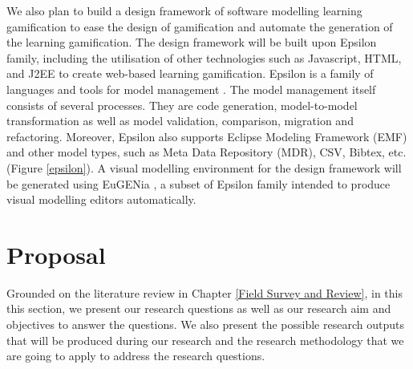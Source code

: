 \documentclass[12pt, a4paper]{report}
\begin{document}
{We also plan to build a design framework of software modelling learning gamification to ease the design of gamiﬁcation and automate the generation of the learning gamification. The design framework will be built upon Epsilon family, including the utilisation of other technologies such as Javascript, HTML, and J2EE to create web-based learning gamification. Epsilon is a family of languages and tools for model management \cite{kolovos2010epsilon}. The model management itself consists of several processes. They are code generation, model-to-model transformation as well as model validation, comparison, migration and refactoring. Moreover, Epsilon also supports Eclipse Modeling Framework (EMF) and other model types, such as Meta Data Repository (MDR), CSV, Bibtex, etc. (Figure \ref{epsilon}). A visual modelling environment for the design framework will be generated using EuGENia \cite{kolovos2015eugenia}, a subset of Epsilon family intended to produce visual modelling editors automatically.

\chapter{Proposal}
\label{Proposal}
Grounded on the literature review in Chapter \ref{Field Survey and Review}, in this this section, we present our research questions as well as our research aim and objectives to answer the questions. We also present the possible research outputs that will be produced during our research and the research methodology that we are going to apply to address the research questions.   

}
\end{document}
